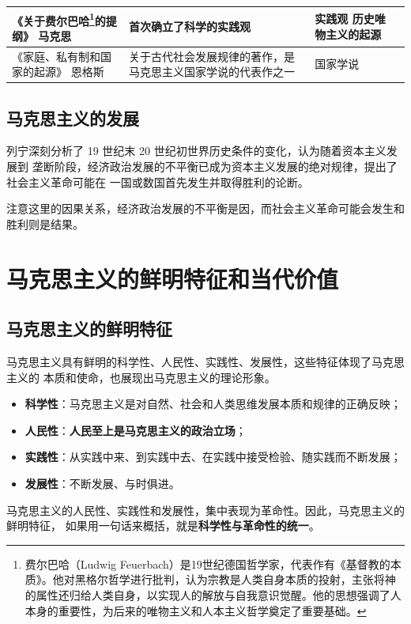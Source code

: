 \documentclass[10pt, UTF8]{book} %
\begin{document}
{\begin{longtable}{p{}|p{}p{}p{}}
    《关于费尔巴哈\footnote{
        费尔巴哈（Ludwig Feuerbach）是19世纪德国哲学家，代表作有《基督教的本质》。他对黑格尔哲学进行批判，认为宗教是人类自身本质的投射，主张将神的属性还归给人类自身，以实现人的解放与自我意识觉醒。他的思想强调了人本身的重要性，为后来的唯物主义和人本主义哲学奠定了重要基础。
    }的提纲》 \newline 马克思 
    & 首次确立了科学的实践观 
    & 实践观 \newline 历史唯物主义的起源 \\
    \hline
    《家庭、私有制和国家的起源》 \newline 恩格斯 
    & 关于古代社会发展规律的著作，是马克思主义国家学说的代表作之一 
    & 国家学说 \\ 
    \hline
\end{longtable}}

\subsection{马克思主义的发展}

列宁深刻分析了 19 世纪末 20 世纪初世界历史条件的变化，认为随着资本主义发展到
垄断阶段，经济政治发展的不平衡已成为资本主义发展的绝对规律，提出了社会主义革命可能在
一国或数国首先发生并取得胜利的论断。
\begin{remark}
    注意这里的因果关系，经济政治发展的不平衡是因，而社会主义革命可能会发生和胜利则是结果。
\end{remark}




\section{马克思主义的鲜明特征和当代价值}

\subsection{马克思主义的鲜明特征}

马克思主义具有鲜明的科学性、人民性、实践性、发展性，这些特征体现了马克思主义的
本质和使命，也展现出马克思主义的理论形象。
\begin{itemize}[itemsep=0pt]
    \item \textbf{科学性}：马克思主义是对自然、社会和人类思维发展本质和规律的正确反映；
    \item \textbf{人民性}：\textbf{人民至上是马克思主义的政治立场}；
    \item \textbf{实践性}：从实践中来、到实践中去、在实践中接受检验、随实践而不断发展；
    \item \textbf{发展性}：不断发展、与时俱进。
\end{itemize}
马克思主义的人民性、实践性和发展性，集中表现为革命性。因此，马克思主义的鲜明特征，
如果用一句话来概括，就是\textbf{科学性与革命性的统一}。
\end{document}
